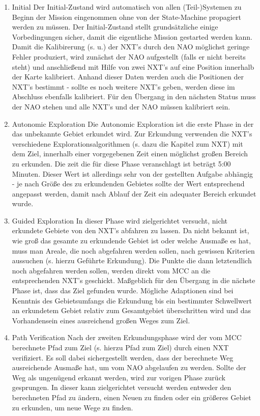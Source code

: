 \begin{enumerate}
\item Initial
Der Initial-Zustand wird automatisch von allen (Teil-)Systemen zu Beginn der Mission eingenommen ohne von der State-Machine propagiert werden zu müssen. Der Initial-Zustand stellt grundsätzliche einige Vorbedingungen sicher, damit die eigentliche Mission gestarted werden kann. Damit die Kalibirerung (s. u.) der NXT's durch den NAO möglichst geringe Fehler produziert, wird zunächst der NAO aufgestellt (falls er nicht bereits steht) und anschließend mit Hilfe von zwei NXT's auf eine Position innerhalb der Karte kalibriert. Anhand dieser Daten werden auch die Positionen der NXT's bestimmt - sollte es noch weitere NXT's geben, werden diese im Abschluss ebenfalls kalibriert. Für den Übergang in den nächsten Status muss der NAO stehen und alle NXT's und der NAO müssen kalibriert sein.

\item Autonomic Exploration
Die Autonomic Exploration ist die erste Phase in der das unbekannte Gebiet erkundet wird. Zur Erkundung verwenden die NXT's verschiedene Explorationsalgorithmen (s. dazu die Kapitel zum NXT) mit dem Ziel, innerhalb einer vorgegebenen Zeit einen möglichst großen Bereich zu erkunden. Die zeit die für diese Phase veranschlagt ist beträgt 5:00 Minuten. Dieser Wert ist allerdings sehr von der gestellten Aufgabe abhängig - je nach Größe des zu erkundenden Gebietes sollte der Wert entsprechend angepasst werden, damit nach Ablauf der Zeit ein adequater Bereich erkundet wurde.

\item Guided Exploration
In dieser Phase wird zielgerichtet versucht, nicht erkundete Gebiete von den NXT's abfahren zu lassen. Da nicht bekannt ist, wie groß das gesamte zu erkundende Gebiet ist oder welche Ausmaße es hat, muss man Areale, die noch abgefahren werden sollen, nach gewissen Kriterien aussuchen (s. hierzu Geführte Erkundung). Die Punkte die dann letztendlich noch abgefahren werden sollen, werden direkt vom MCC an die entsprechenden NXT's geschickt. Maßgeblich für den Übergang in die nächste Phase ist, dass das Ziel gefunden wurde. Mögliche Adaptionen sind bei Kenntnis des Gebietsumfangs die Erkundung bis ein bestimmter Schwellwert an erkundetem Gebiet relativ zum Gesamtgebiet überschritten wird und das Vorhandensein eines ausreichend großen Weges zum Ziel.

\item Path Verification
Nach der zweiten Erkundungsphase wird der vom MCC berechnete Pfad zum Ziel (s. hierzu Pfad zum Ziel) durch einen NXT verifiziert. Es soll dabei sichergestellt werden, dass der berechnete Weg ausreichende Ausmaße hat, um vom NAO abgelaufen zu werden. Sollte der Weg als ungenügend erkannt werden, wird zur vorigen Phase zurück gesprungen. In dieser kann zielgerichtet versucht werden entweder den berechneten Pfad zu ändern, einen Neuen zu finden oder ein größeres Gebiet zu erkunden, um neue Wege zu finden.


\end{enumerate}
